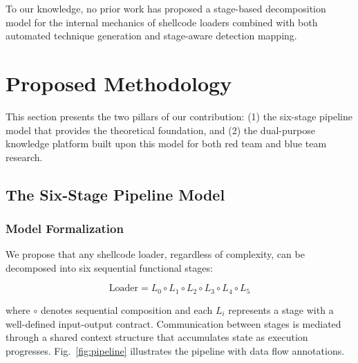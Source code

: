 \documentclass[10pt,a4paper,twocolumn]{article}
\begin{document}
To our knowledge, no prior work has proposed a stage-based decomposition model for the internal mechanics of shellcode loaders combined with both automated technique generation and stage-aware detection mapping.

\section{Proposed Methodology}

This section presents the two pillars of our contribution: (1) the six-stage pipeline model that provides the theoretical foundation, and (2) the dual-purpose knowledge platform built upon this model for both red team and blue team research.

\subsection{The Six-Stage Pipeline Model}

\subsubsection{Model Formalization}

We propose that any shellcode loader, regardless of complexity, can be decomposed into six sequential functional stages:

\begin{equation}
    \text{Loader} = L_0 \circ L_1 \circ L_2 \circ L_3 \circ L_4 \circ L_5
    \label{eq:pipeline}
\end{equation}

\noindent where $\circ$ denotes sequential composition and each $L_i$ represents a stage with a well-defined input-output contract.
Communication between stages is mediated through a shared context structure that accumulates state as execution progresses.
Fig.~\ref{fig:pipeline} illustrates the pipeline with data flow annotations.
\end{document}
